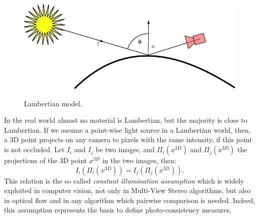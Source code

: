 \begin{figure}[t]
\includegraphics[width=0.99\columnwidth]{./img/ch_soa/lambert}
\label{fig:lamber}
 \caption{Lambertian model.} 
\end{figure}

In the real world almost no material is Lambertian, but the majority is close to Lambertian.
If we assume a point-wise light source in a Lambertian world, then, a 3D point projects on any camera to pixels with the same intensity, if this point is not occluded. 
Let $I_i$ and $I_j$ be two images, and $\Pi_i(x^{3D})$ and  $\Pi_j(x^{3D})$ the projections of the 3D point $x^{3D}$ in the two images, then:
\begin{equation}
 \label{eq:const_bright} 
 I_i(\Pi_i(x^{3D})) = I_j(\Pi_j(x^{3D})).
\end{equation}
This relation is the so called \emph{constant illumination assumption} which is widely exploited in computer vision, not only in Multi-View Stereo algorithms, but also in optical flow and in  any algorithm which pairwise comparison is needed.
Indeed, this assumption represents the basis to define photo-consistency measures.



